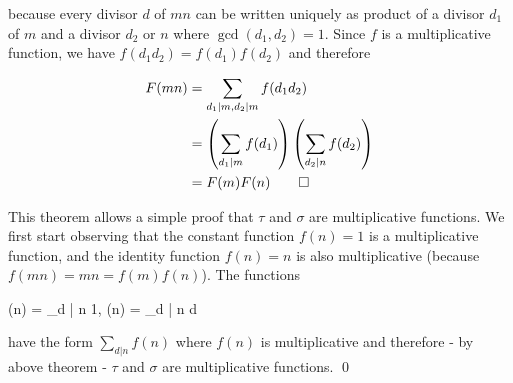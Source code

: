 because every divisor $d$ of $mn$ can be written uniquely as product of a divisor $d_1$ of $m$ and a divisor $d_2$ or $n$ where $\gcd(d_1, d_2) = 1$. Since $f$ is a multiplicative function, we have $f(d_1 d_2) = f(d_1) f(d_2)$ and therefore

\begin{align*}
    F(mn) &= \sum_{d_1 | m, d_2 | m} f(d_1 d_2) \\
          &= \left( \sum_{d_1 | m} f(d_1) \right) \left( \sum_{d_2 | n} f(d_2) \right) \\
          &= F(m) F(n) \qed
\end{align*}

This theorem allows a simple proof that $\tau$ and $\sigma$ are multiplicative functions. We first start observing that the constant function $f(n) = 1$ is a multiplicative function, and the identity function $f(n) = n$ is also multiplicative (because $f(mn) = mn = f(m) f(n)$). The functions

\bee
\tau(n) = \sum_{d | n} 1, \qquad \sigma(n) = \sum_{d | n} d
\eee

have the form $\sum_{d|n} f(n)$ where $f(n)$ is multiplicative and therefore - by above theorem - $\tau$ and $\sigma$ are multiplicative functions. \qed




